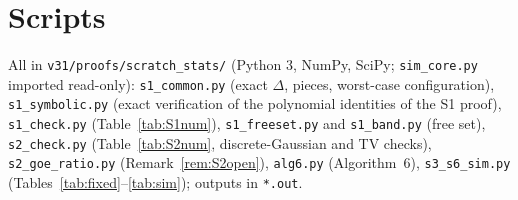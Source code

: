\documentclass[11pt]{article}
\theoremstyle{definition}
\theoremstyle{plain}
\begin{document}
\section*{Scripts}
All in \texttt{v31/proofs/scratch\_stats/} (Python 3, NumPy, SciPy; \texttt{sim\_core.py} imported read-only):
\texttt{s1\_common.py} (exact $\Delta$, pieces, worst-case configuration), \texttt{s1\_symbolic.py} (exact verification of the polynomial identities of the S1 proof), \texttt{s1\_check.py} (Table~\ref{tab:S1num}), \texttt{s1\_freeset.py} and \texttt{s1\_band.py} (free set), \texttt{s2\_check.py} (Table~\ref{tab:S2num}, discrete-Gaussian and TV checks), \texttt{s2\_goe\_ratio.py} (Remark~\ref{rem:S2open}), \texttt{alg6.py} (Algorithm~6), \texttt{s3\_s6\_sim.py} (Tables~\ref{tab:fixed}--\ref{tab:sim}); outputs in \texttt{*.out}.
\end{document}
